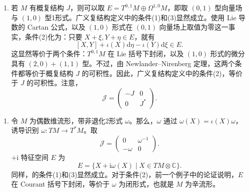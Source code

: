 \begin{example}\label{ex:6.34}
\begin{enumerate}[label=(\arabic*)]
\item 若 $M$ 有概复结构 $J$，则可以取 $E=T^{0,1}M\oplus\Omega^{1,0}M$，即取 $(0,1)$ 型向量场与 $(1,0)$ 型1形式。广义复结构定义中的条件(1)和(3)显然成立。使用 Lie 导数的 Cartan 公式，以及 $(1,0)$ 形式在 $(0,1)$ 向量场上取值为零这一事实，条件(2)化为：只要 $X+\xi,Y+\eta\in E$，就有
\[
[X,Y]+\iota(X)\mathrm d\eta-\iota(Y)\mathrm d\xi\in E.
\]
这显然等价于两个条件：$T^{0,1}M$ 在 Lie 括号下封闭，以及 $(1,0)$ 形式的微分具有 $(2,0)+(1,1)$ 型。不过，由 Newlander--Nirenberg 定理，这两个条件都等价于概复结构 $J$ 的可积性。因此，广义复结构定义中的条件(2)，等价于 $J$ 的可积性。注意，
\[
\mathcal J=\begin{pmatrix}-J&0\\0&J^*\end{pmatrix}.
\]
\end{enumerate}

\begin{enumerate}[label=(\arabic*),start=2]
\item 令 $M$ 为偶数维流形，带非退化2形式 $\omega$。那么，$\omega$ 通过 $\omega(X)=\iota(X)\omega$，诱导识别 $\omega\colon TM\to T^*M$。取
\[
\mathcal J=\begin{pmatrix}0&\omega^{-1}\\-\omega&0\end{pmatrix}.
\]
$+\mathrm i$ 特征空间 $E$ 为
\[
E=\{X+\mathrm i\omega(X)\mid X\in TM\otimes\mathbb C\}.
\]
同样，的条件(1)和(3)显然成立。对于条件(2)，前一个例子中的论证说明，$E$ 在 Courant 括号下封闭，等价于 $\omega$ 为闭形式，也就是 $M$ 为辛流形。
\end{enumerate}


\end{example}
